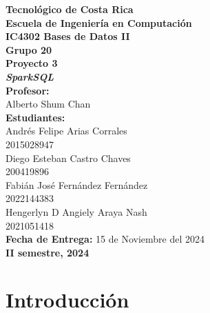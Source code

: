 \documentclass{article}
\begin{document}
\begin{titlepage}
    \centering
    {\Large\textbf{Tecnológico de Costa Rica}}\\[0.5cm]
    {\Large\textbf{Escuela de Ingeniería en Computación}}\\[0.5cm]
    {\Large\textbf{IC4302 Bases de Datos II}}\\[0.5cm]
    {\Large\textbf{Grupo 20}}\\[2cm]

    {\Large\bfseries Proyecto 3}\\[0.5cm]
    {\Large\bfseries \emph{SparkSQL}}\\[2cm]

    \textbf{\large Profesor:}\\
    \large Alberto Shum Chan \\[1.5cm]

    \textbf{\large Estudiantes:}\\[0.5cm]
    \large Andrés Felipe Arias Corrales\\
    2015028947\\[0.5cm]
    \large Diego Esteban Castro Chaves\\
    200419896\\[0.5cm]
    \large Fabián José Fernández Fernández\\
    2022144383\\[0.5cm]
    \large Hengerlyn D Angiely Araya Nash\\
    2021051418\\[2cm]

    \textbf{\large Fecha de Entrega:} 15 de Noviembre del 2024\\[0.5cm]
    \textbf{\large II semestre, 2024}
\end{titlepage}

\setlength{\parskip}{\baselineskip}

\newpage  %
\tableofcontents  %
\newpage
\setlength{\parindent}{0pt}  %

\section{Introducción}
\end{document}
